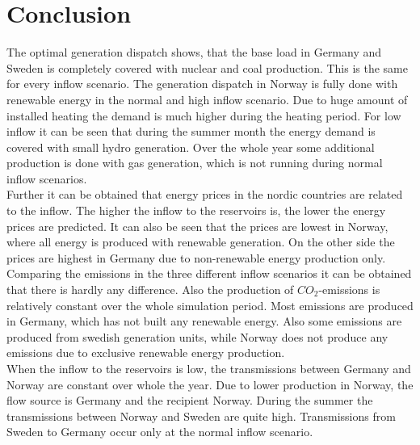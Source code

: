 \documentclass{article}
\begin{document}
\section{Conclusion}
The optimal generation dispatch shows, that the base load in Germany and Sweden is completely covered with nuclear and coal production. This is the same for every inflow scenario. The generation dispatch in Norway is fully done with renewable energy in the normal and high inflow scenario. Due to huge amount of installed heating the demand is much higher during the heating period. For low inflow it can be seen that during the summer month the energy demand is covered with small hydro generation. Over the whole year some additional production is done with gas generation, which is not running during normal inflow scenarios.\\
Further it can be obtained that energy prices in the nordic countries are related to the inflow. The higher the inflow to the reservoirs is, the lower the energy prices are predicted. It can also be seen that the prices are lowest in Norway, where all energy is produced with renewable generation. On the other side the prices are highest in Germany due to non-renewable energy production only.\\
Comparing the emissions in the three different inflow scenarios it can be obtained that there is hardly any difference. Also the production of $CO_2$-emissions is relatively constant over the whole simulation period. Most emissions are produced in Germany, which has not built any renewable energy. Also some emissions are produced from swedish generation units, while Norway does not produce any emissions due to exclusive renewable energy production.\\
When the inflow to the reservoirs is low, the transmissions between Germany and Norway are constant over whole the year. Due to lower production in Norway, the flow source is Germany and the recipient Norway. During the summer the transmissions between Norway and Sweden are quite high. Transmissions from Sweden to Germany occur only at the normal inflow scenario.\\[0.3cm]
\end{document}

